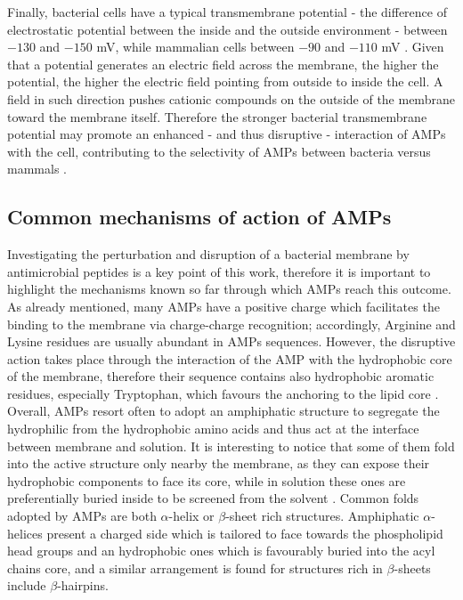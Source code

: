 Finally, bacterial cells have a typical transmembrane potential - the difference of electrostatic potential between the inside and the outside environment - between $-130$ and $-150$ mV, while mammalian cells between $-90$ and $-110$ mV \cite{Yeaman2003,Matsuzaki2009,Ebenhan2014}.
%
Given that a potential generates an electric field across the membrane, the higher the potential, the higher the electric field pointing from outside to inside the cell. A field in such direction pushes cationic compounds on the outside of the membrane toward the membrane itself. Therefore the stronger bacterial transmembrane potential may promote an enhanced - and thus disruptive - interaction of AMPs with the cell, contributing to the selectivity of AMPs between bacteria versus mammals \cite{Yeaman2003}.

\subsection{Common mechanisms of action of AMPs} \label{AMP_mechs}
Investigating the perturbation and disruption of a bacterial membrane by antimicrobial peptides is a key point of this work, therefore it is important to highlight the mechanisms known so far through which AMPs reach this outcome.
%
As already mentioned, many AMPs have a positive charge which facilitates the binding to the membrane via charge-charge recognition; accordingly, Arginine and Lysine residues are usually abundant in AMPs sequences. However, the disruptive action takes place through the interaction of the AMP with the hydrophobic core of the membrane, therefore their sequence contains also hydrophobic aromatic residues, especially Tryptophan, which favours the anchoring to the lipid core \cite{Chan2006}.
%
Overall, AMPs resort often to adopt an amphiphatic structure to segregate the hydrophilic from the hydrophobic amino acids and thus act at the interface between membrane and solution. It is interesting to notice that some of them fold into the active structure only nearby the membrane, as they can expose their hydrophobic components to face its core, while in solution these ones are preferentially buried inside to be screened from the solvent \cite{Nguyen2011}.
%
Common folds adopted by AMPs are both $\alpha$-helix or $\beta$-sheet rich structures. Amphiphatic $\alpha$-helices present a charged side which is tailored to face towards the phospholipid head groups and an hydrophobic ones which is favourably buried into the acyl chains core,
%
and a similar arrangement is found for structures rich in $\beta$-sheets include $\beta$-hairpins.



